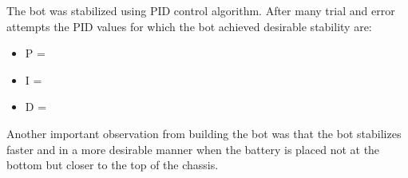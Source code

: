 The bot was stabilized using PID control algorithm. After many trial and error attempts the PID values for which the bot achieved desirable stability are:
\begin{itemize}
  \item P =
  \item I =
  \item D =\\
\end{itemize}

Another important observation from building the bot was that the bot stabilizes faster and in a more desirable manner when the battery is placed not at the bottom but closer to the top of the chassis.
